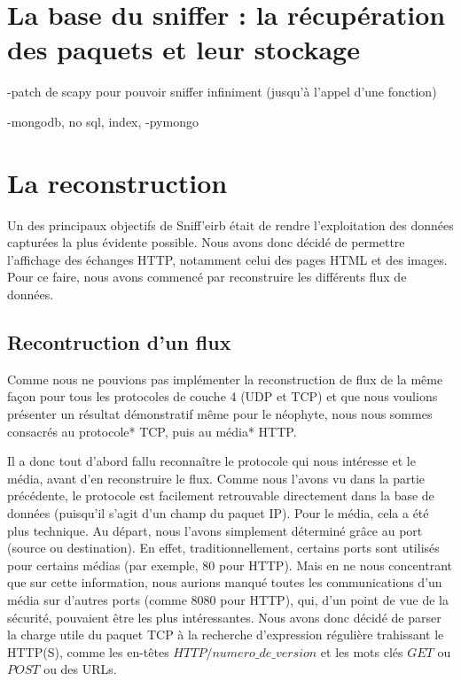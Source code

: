 \section{La base du sniffer : la récupération des paquets et leur stockage}


-patch de scapy pour pouvoir sniffer infiniment (jusqu'à l'appel d'une fonction)

-mongodb, no sql, index, 
-pymongo


\section{La reconstruction}

Un des principaux objectifs de Sniff'eirb était de rendre l'exploitation des données capturées la plus évidente possible.
Nous avons donc décidé de permettre l'affichage des échanges HTTP, notamment celui des pages HTML et des images. Pour ce
faire, nous avons commencé par reconstruire les différents flux de données.

\subsection{Recontruction d'un flux}

Comme nous ne pouvions pas implémenter la reconstruction de flux de la même façon pour tous les protocoles de couche 4 (UDP et TCP) et
que nous voulions présenter un résultat démonstratif même pour le néophyte, nous nous sommes consacrés au protocole* TCP, puis au média* HTTP.


\indent Il a donc tout d'abord fallu reconnaître le protocole qui nous intéresse et le média, avant d'en reconstruire le flux. Comme nous l'avons vu 
dans la partie précédente, le protocole est facilement retrouvable directement dans la base de données (puisqu'il s'agit d'un champ du paquet IP). 
Pour le média, cela a été plus technique. Au départ, nous l'avons simplement déterminé grâce au port (source ou destination). En effet, traditionnellement,
certains ports sont utilisés pour certains médias (par exemple, 80 pour HTTP). Mais en ne nous concentrant que sur cette information, nous aurions manqué
toutes les communications d'un média sur d'autres ports (comme 8080 pour HTTP), qui, d'un point de vue de la sécurité, pouvaient être les plus intéressantes.
Nous avons donc décidé de parser la charge utile du paquet TCP à la recherche d'expression régulière trahissant le HTTP(S), comme les en-têtes
 $HTTP/numero\_de\_version$ et les mots clés $GET$ ou $POST$ ou des URLs.


